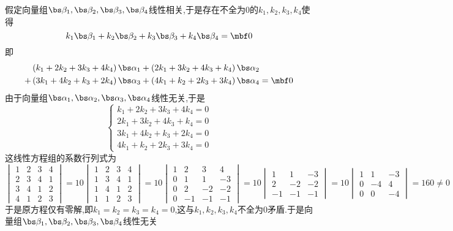 \documentclass{ctexart}
\begin{document}
\begin{solution}
    假定向量组$\bs\beta_1,\bs\beta_2,\bs\beta_3,\bs\beta_4$线性相关,于是存在不全为$0$的$k_1,k_2,k_3,k_4$使得
    \[k_1\bs\beta_1+k_2\bs\beta_2+k_3\bs\beta_3+k_4\bs\beta_4=\mbf0\]
    即
    \[\begin{aligned}
        &\left(k_1+2k_2+3k_3+4k_4\right)\bs\alpha_1+\left(2k_1+3k_2+4k_3+k_4\right)\bs\alpha_2\\
        +&\left(3k_1+4k_2+k_3+2k_4\right)\bs\alpha_3+\left(4k_1+k_2+2k_3+3k_4\right)\bs\alpha_4=\mbf0
    \end{aligned}\]
    由于向量组$\bs\alpha_1,\bs\alpha_2,\bs\alpha_3,\bs\alpha_4$线性无关,于是
    \[\left\{\begin{array}{l}
        k_1+2k_2+3k_3+4k_4=0\\
        2k_1+3k_2+4k_3+k_4=0\\
        3k_1+4k_2+k_3+2k_4=0\\
        4k_1+k_2+2k_3+3k_4=0
    \end{array}\right.\]
    这线性方程组的系数行列式为
    \[\begin{vmatrix}
        1&2&3&4\\
        2&3&4&1\\
        3&4&1&2\\
        4&1&2&3
    \end{vmatrix}=10\begin{vmatrix}
        1&2&3&4\\
        1&3&4&1\\
        1&4&1&2\\
        1&1&2&3
    \end{vmatrix}=10\begin{vmatrix}
        1&2&3&4\\
        0&1&1&-3\\
        0&2&-2&-2\\
        0&-1&-1&-1
    \end{vmatrix}=10\begin{vmatrix}
        1&1&-3\\
        2&-2&-2\\
        -1&-1&-1
    \end{vmatrix}=10\begin{vmatrix}
        1&1&-3\\
        0&-4&4\\
        0&0&-4
    \end{vmatrix}=160\neq0\]
    于是原方程仅有零解,即$k_1=k_2=k_3=k_4=0$,这与$k_1,k_2,k_3,k_4$不全为$0$矛盾.于是向量组$\bs\beta_1,\bs\beta_2,\bs\beta_3,\bs\beta_4$线性无关
\end{solution}
\end{document}

